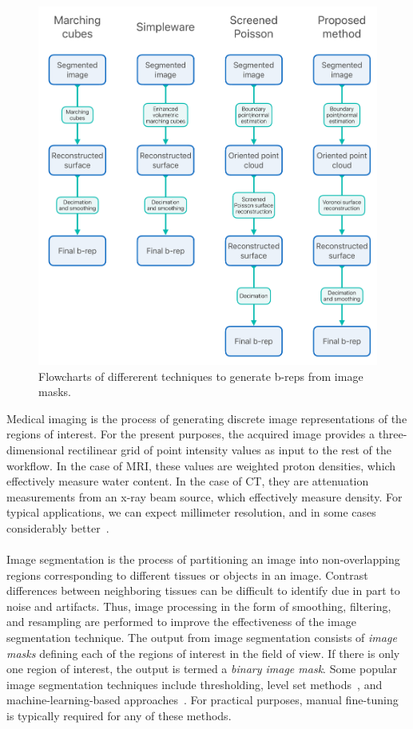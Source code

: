 \begin{figure}[t]
	\centering
		\includegraphics[scale=0.3]{media/flowchartNew.pdf}
	\caption{Flowcharts of differerent techniques to generate b-reps from image masks.}
	\label{fig:flowchart}
\end{figure}\noindent

%
Medical imaging is the process of generating discrete image representations of the regions of interest. For the present purposes, the acquired image provides a three-dimensional rectilinear grid of point intensity values as input to the rest of the workflow. In the case of MRI, these values are weighted proton densities, which effectively measure water content. In the case of CT, they are attenuation measurements from an x-ray beam source, which effectively measure density. For typical applications, we can expect millimeter resolution, and in some cases considerably better~\cite{van2012super}.\\ \\
%
Image segmentation is the process of partitioning an image into non-overlapping regions corresponding to different tissues or objects in an image. Contrast differences between neighboring tissues can be difficult to identify due in part to noise and artifacts. Thus, image processing in the form of smoothing, filtering, and resampling are performed to improve the effectiveness of the image segmentation technique. The output from image segmentation consists of \textit{image masks} defining each of the regions of interest in the field of view. If there is only one region of interest, the output is termed a \textit{binary image mask}. Some popular image segmentation techniques include thresholding, level set methods~\cite{malladi_1995, sethian_1996}, and machine-learning-based approaches~\cite{litjens_2017}.  For practical purposes, manual fine-tuning is typically required for any of these methods.\\ \\



